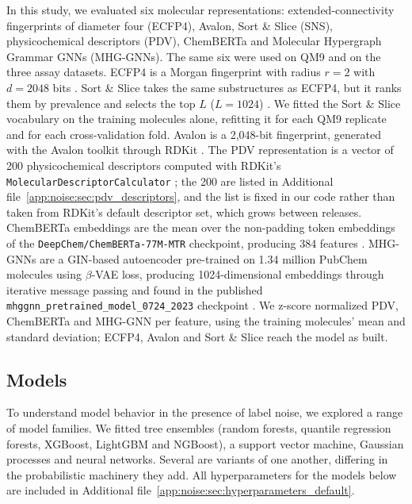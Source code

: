 In this study, we evaluated six molecular representations: extended-connectivity fingerprints of diameter four (ECFP4), Avalon, Sort \& Slice (SNS), physicochemical descriptors (PDV), ChemBERTa and Molecular Hypergraph Grammar GNNs (MHG-GNNs). The same six were used on QM9 and on the three assay datasets. ECFP4 is a Morgan fingerprint with radius $r = 2$ with $d = 2048$ bits \citep{rogers2010, rdkit}. Sort \& Slice takes the same substructures as ECFP4, but it ranks them by prevalence and selects the top $L$ ($L=1024$) \citep{sns}. We fitted the Sort \& Slice vocabulary on the training molecules alone, refitting it for each QM9 replicate and for each cross-validation fold.  Avalon is a 2,048-bit fingerprint, generated with the Avalon toolkit through RDKit \citep{avalon, rdkit}. The PDV representation is a vector of 200 physicochemical descriptors computed with RDKit's \texttt{MolecularDescriptorCalculator} \citep{rdkit, Cherkasov2014}; the 200 are listed in Additional file~\ref{app:noise:sec:pdv_descriptors}, and the list is fixed in our code rather than taken from RDKit's default descriptor set, which grows between releases. ChemBERTa embeddings are the mean over the non-padding token embeddings of the \texttt{DeepChem/ChemBERTa-77M-MTR} checkpoint, producing 384 features \citep{Ahmad2022}. MHG-GNNs are a GIN-based autoencoder pre-trained on 1.34 million PubChem molecules using $\beta$-VAE loss, producing 1024-dimensional embeddings through iterative message passing and found in the published \texttt{mhggnn\_pretrained\_model\_0724\_2023} checkpoint \citep{kishimoto2023}. We z-score normalized PDV, ChemBERTa and MHG-GNN per feature, using the training molecules' mean and standard deviation; ECFP4, Avalon and Sort \& Slice reach the model as built.

\subsection{Models}

To understand model behavior in the presence of label noise, we explored a range of model families. We fitted tree ensembles (random forests, quantile regression forests, XGBoost, LightGBM and NGBoost), a support vector machine, Gaussian processes and neural networks. Several are variants of one another, differing in the probabilistic machinery they add. All hyperparameters for the models below are included in Additional file~\ref{app:noise:sec:hyperparameters_default}.

